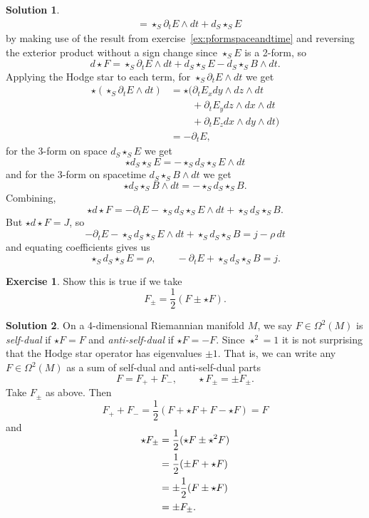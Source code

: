 \documentclass[11pt, a4paper]{article}
\theoremstyle{definition}
\newtheorem{ex}{Exercise}[part]
\newtheorem{sol}{Solution}[part]
\begin{document}
\begin{sol}
\begin{align*}
        &= \star_S \partial_t E \wedge dt + d_S \star_S E
\end{align*}
by making use of the result from exercise~\ref{ex:pformspaceandtime} and reversing the exterior product without a sign change since $\star_S E$ is a 2-form, so
\[
    d \star F = \star_S \partial_t E \wedge dt + d_S \star_S E - d_S \star_S B \wedge dt.
\]
Applying the Hodge star to each term, for $\star_S \partial_t E \wedge dt$ we get
\begin{align*}
    \star (\star_S \partial_t E \wedge dt) &= \star \bigl(
            \partial_t E_x dy \wedge dz \wedge dt \\
            &\phantom{= \star \,\, } + \partial_t E_y dz \wedge dx \wedge dt \\
            &\phantom{= \star \,\, } + \partial_t E_z dx \wedge dy \wedge dt \bigr) \\
        &= - \partial_t E,
\end{align*}
for the 3-form on space $d_S \star_S E$ we get
\[
    \star d_S \star_S E = - \star_S d_S \star_S E \wedge dt
\]
and for the 3-form on spacetime $d_S \star_S B \wedge dt$ we get
\[
    \star d_S \star_S B \wedge dt = - \star_S d_S \star_S B.
\]
Combining,
\[
    \star d \star F = - \partial_t E - \star_S d_S \star_S E \wedge dt + \star_S d_S \star_S B.
\]
But $\star d \star F = J$, so
\[
    - \partial_t E - \star_S d_S \star_S E \wedge dt + \star_S d_S \star_S B = j - \rho \, dt
\]
and equating coefficients gives us
\[
    \star_S d_S \star_S E = \rho, \qquad
    - \partial_t E + \star_S d_S \star_S B = j.
\]

\end{sol}

\begin{ex}

Show this is true if we take
\[
    F_\pm = \frac{1}{2} (F \pm \star F).
\]

\end{ex}

\begin{sol}

On a 4-dimensional Riemannian manifold $M$, we say $F \in \Omega^2(M)$ is \emph{self-dual} if $\star F = F$ and \emph{anti-self-dual} if $\star F = - F$.
Since $\star^2 = 1$ it is not surprising that the Hodge star operator has eigenvalues $\pm 1$. That is, we can write any $F \in \Omega^2(M)$ as a sum of self-dual and anti-self-dual parts
\[
    F = F_+ + F_-, \qquad
    \star F_\pm = \pm F_\pm.
\]
Take $F_\pm$ as above. Then
\[
    F_+ + F_- = \frac{1}{2}(F + \star F + F - \star F) = F
\]
and
\begin{align*}
    \SwapAboveDisplaySkip
    \star F_\pm &= \frac{1}{2} (\star F \pm \star^2 F) \\
                &= \frac{1}{2} (\pm F + \star F) \\
                &= \pm \frac{1}{2} (F \pm \star F) \\
                &= \pm F_\pm.
\end{align*}

\end{sol}
\end{document}
